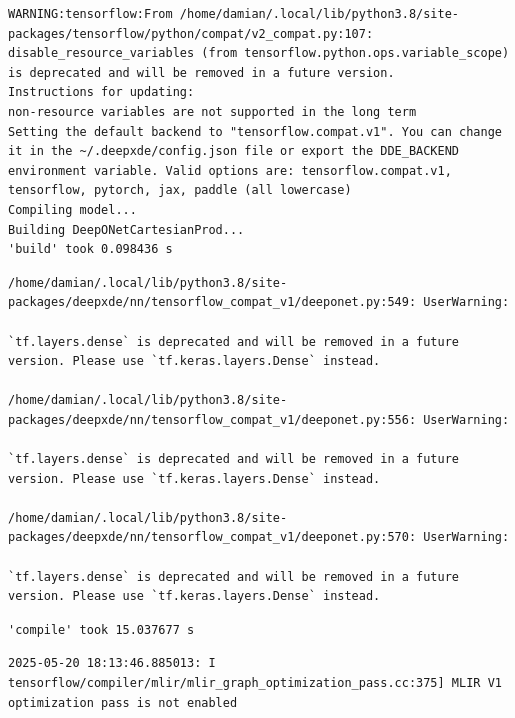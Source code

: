 \documentclass[
  spanish,
  us-letterpaper,
  DIV=11,
  numbers=noendperiod]{scrreprt}
\begin{document}
\begin{verbatim}
WARNING:tensorflow:From /home/damian/.local/lib/python3.8/site-packages/tensorflow/python/compat/v2_compat.py:107: disable_resource_variables (from tensorflow.python.ops.variable_scope) is deprecated and will be removed in a future version.
Instructions for updating:
non-resource variables are not supported in the long term
Setting the default backend to "tensorflow.compat.v1". You can change it in the ~/.deepxde/config.json file or export the DDE_BACKEND environment variable. Valid options are: tensorflow.compat.v1, tensorflow, pytorch, jax, paddle (all lowercase)
Compiling model...
Building DeepONetCartesianProd...
'build' took 0.098436 s
\end{verbatim}

\begin{verbatim}
/home/damian/.local/lib/python3.8/site-packages/deepxde/nn/tensorflow_compat_v1/deeponet.py:549: UserWarning:

`tf.layers.dense` is deprecated and will be removed in a future version. Please use `tf.keras.layers.Dense` instead.

/home/damian/.local/lib/python3.8/site-packages/deepxde/nn/tensorflow_compat_v1/deeponet.py:556: UserWarning:

`tf.layers.dense` is deprecated and will be removed in a future version. Please use `tf.keras.layers.Dense` instead.

/home/damian/.local/lib/python3.8/site-packages/deepxde/nn/tensorflow_compat_v1/deeponet.py:570: UserWarning:

`tf.layers.dense` is deprecated and will be removed in a future version. Please use `tf.keras.layers.Dense` instead.
\end{verbatim}

\begin{verbatim}
'compile' took 15.037677 s
\end{verbatim}

\begin{verbatim}
2025-05-20 18:13:46.885013: I tensorflow/compiler/mlir/mlir_graph_optimization_pass.cc:375] MLIR V1 optimization pass is not enabled
\end{verbatim}
\end{document}

